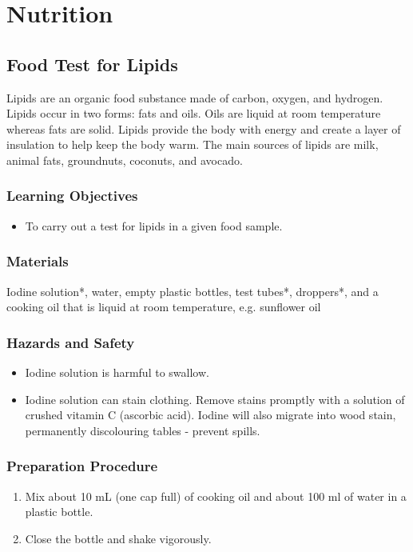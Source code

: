 \section{Nutrition}

\subsection{Food Test for Lipids}
Lipids are an organic food substance made of carbon, oxygen, and hydrogen. Lipids occur in two forms: fats and oils. Oils are liquid at room temperature whereas fats are solid. Lipids provide the body with energy and create a layer of insulation to help keep the body warm. The main sources of lipids are milk, animal fats, groundnuts, coconuts, and avocado.

\subsubsection*{Learning Objectives}
\begin{itemize}
\item{To carry out a test for lipids in a given food sample.}
\end{itemize}

\subsubsection*{Materials}
Iodine solution*, water, empty plastic bottles, test tubes*, droppers*, and a cooking oil that is liquid at room temperature, e.g. sunflower oil

\subsubsection*{Hazards and Safety}
\begin{itemize}
\item{Iodine solution is harmful to swallow.}
\item{Iodine solution can stain clothing. Remove stains promptly with a solution of crushed vitamin C (ascorbic acid). Iodine will also migrate into wood stain, permanently discolouring tables - prevent spills.}
\end{itemize}

\subsubsection*{Preparation Procedure}
\begin{enumerate}
\item{Mix about 10 mL (one cap full) of cooking oil and about 100 ml of water in a plastic bottle.}
\item{Close the bottle and shake vigorously.}
\end{enumerate}

